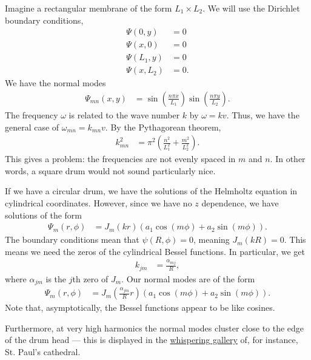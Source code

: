 \documentclass[10pt]{mypackage}
\begin{document}
  Imagine a rectangular membrane of the form $L_1\times L_2$. We will use the Dirichlet boundary conditions,
  \begin{align*}
    \Psi\left( 0,y \right) &= 0\\
    \Psi\left( x,0 \right) &= 0\\
    \Psi\left( L_1,y \right) &= 0\\
    \Psi\left( x,L_2 \right) &= 0.
  \end{align*}
  We have the normal modes
  \begin{align*}
    \Psi_{mn} \left( x,y \right) &= \sin\left( \frac{n\pi x}{L_1} \right)\sin\left( \frac{n\pi y}{L_2} \right).
  \end{align*}
  The frequency $\omega$ is related to the wave number $k$ by $\omega = kv$. Thus, we have the general case of $\omega_{mn} = k_{mn} v$. By the Pythagorean theorem,
  \begin{align*}
    k_{mn}^2 &= \pi^2\left( \frac{n^2}{L_1^2} + \frac{m^2}{L_2^2} \right).
  \end{align*}
  This gives a problem: the frequencies are not evenly spaced in $m$ and $n$. In other words, a square drum would not sound particularly nice.\newline

  If we have a circular drum, we have the solutions of the Helmholtz equation in cylindrical coordinates. However, since we have no $z$ dependence, we have solutions of the form
  \begin{align*}
    \Psi_m\left( r,\phi \right) &= J_m\left( kr \right) \left( a_1\cos\left( m\phi \right) + a_2\sin\left( m\phi \right) \right).
  \end{align*}
  The boundary conditions mean that $\psi\left( R,\phi \right) = 0$, meaning $J_m\left( kR \right) = 0$. This means we need the zeros of the cylindrical Bessel functions. In particular, we get
  \begin{align*}
    k_{jm} &= \frac{\alpha_{mj}}{R},
  \end{align*}
  where $\alpha_{jm}$ is the $j$th zero of $J_m$. Our normal modes are of the form
  \begin{align*}
    \Psi_m\left( r,\phi \right) &= J_m\left(\frac{ \alpha_{jm}}{R}r \right)\left( a_1\cos\left( m\phi \right) + a_2\sin\left( m\phi \right) \right).
  \end{align*}
  Note that, asymptotically, the Bessel functions appear to be like cosines.\newline

  Furthermore, at very high harmonics the normal modes cluster close to the edge of the drum head --- this is displayed in the \href{https://en.wikipedia.org/wiki/Whispering_gallery}{whispering gallery} of, for instance, St. Paul's cathedral.\newline
\end{document}

